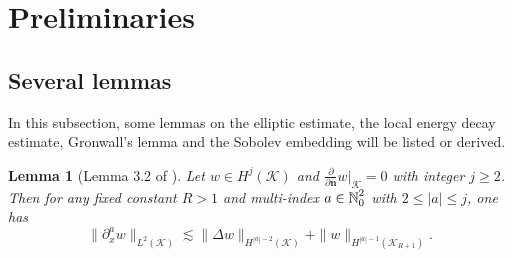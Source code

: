 \documentclass[11pt,twoside]{article}
\def\cK{\mathcal K}
\def\N{\mathop{\mathbb N\kern 0pt}\nolimits}
\def\ds{\displaystyle}
\def\p{\partial}
\def\ls{\lesssim}
\def\bn{\mathbf{n}}
\theoremstyle{plain}
\newtheorem{lemma}[theorem]{Lemma}
\theoremstyle{definition}
\numberwithin{equation}{section}
\begin{document}
\section{Preliminaries}\label{sect2}


\subsection{Several lemmas}

In this subsection, some lemmas on the elliptic estimate, the local energy decay estimate, Gronwall's lemma and
the Sobolev embedding will be listed or derived.


\begin{lemma}[Lemma 3.2 of \cite{Kubo13}]
Let $w\in H^j(\cK)$ and $\ds\frac{\p}{\p\bn}w|_{\cK}=0$ with integer $j\ge2$.
Then for any fixed constant $R>1$ and multi-index $a\in\N_0^2$ with $2\le|a|\le j$, one has
\begin{equation}\label{ellip}
\|\p_x^aw\|_{L^2(\cK)}\ls\|\Delta w\|_{H^{|a|-2}(\cK)}+\|w\|_{H^{|a|-1}(\cK_{R+1})}.
\end{equation}
\end{lemma}
\end{document}
